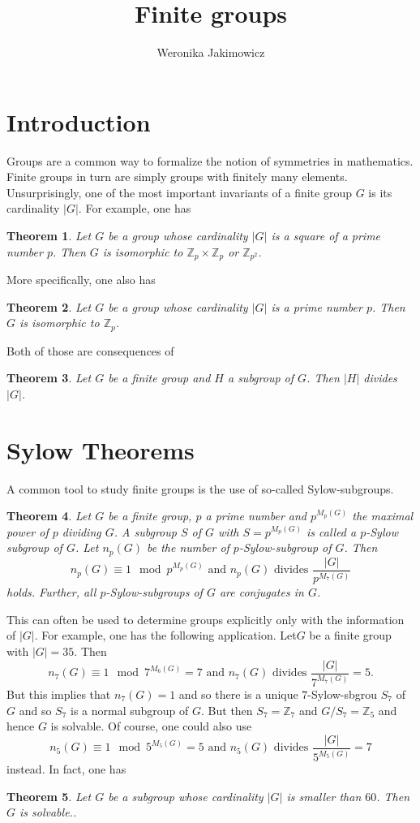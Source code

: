 \documentclass{article}
\title{Finite groups}
\author{Weronika Jakimowicz}
\newtheorem{theorem}{Theorem}[section]
\newcommand{\Z}{\mathbb{Z}}
\begin{document}
\maketitle

\section{Introduction}
Groups are a common way to formalize the notion of symmetries in mathematics. Finite groups in turn are simply groups with finitely many elements. Unsurprisingly, one of the most important invariants of a finite group $G$ is its cardinality $|G|$. For example, one has

\begin{theorem}\label{theorem:1.1}
    Let $G$ be a group whose cardinality $|G|$ is a square of a prime number $p$. Then $G$ is isomorphic to $\Z_p\times\Z_p$ or $\Z_{p^2}$.
\end{theorem}

More specifically, one also has

\begin{theorem}\label{theorem:1.2}
    Let $G$ be a group whose cardinality $|G|$ is a prime number $p$. Then $G$ is isomorphic to $\Z_p$.
\end{theorem}

Both of those are consequences of

\begin{theorem}\cite[Proposition 2.2]{Lang}
    Let $G$ be a finite group and $H$ a subgroup of $G$. Then $|H|$ divides $|G|$.
\end{theorem}

\section{Sylow Theorems}
A common tool to study finite groups is the use of so-called Sylow-subgroups.
\begin{theorem}\cite[Thereom 6.4]{Lang}
Let $G$ be a finite group, $p$ a prime number and $p^{M_p(G)}$ the maximal power of $p$ dividing $G$. A subgroup $S$ of $G$ with $S=p^{M_p(G)}$ is called a $p$-Sylow subgroup of $G$. Let $n_p(G)$ be the number of $p$-Sylow-subgroup of $G$. Then
$$n_p(G)\equiv1\mod p^{M_p(G)}\text{ and }n_p(G)\text{ divides }\frac{|G|}{p^{M_7(G)}}$$
holds. Further, all $p$-Sylow-subgroups of $G$ are conjugates in $G$.
\end{theorem}

This can often be used to determine groups explicitly only with the information of $|G|$. For example, one has the following application. Let$G$ be a finite group with $|G|=35$. Then
$$n_7(G)\equiv 1\mod7^{M_6(G)}=7\text{ and }n_7(G)\text{ divides }\frac{|G|}{7^{M_7(G)}}=5.$$
But this implies that $n_7(G)=1$ and so there is a unique $7$-Sylow-sbgrou $S_7$ of $G$ and so $S_7$ is a normal subgroup of $G$. But then $S_7=\Z_7$ and $G/S_7=\Z_5$ and hence $G$ is solvable. Of course, one could also use
$$n_5(G)\equiv 1\mod5^{M_5(G)}=5\text{ and }n_5(G)\text{ divides }\frac{|G|}{5^{M_5(G)}}=7$$
instead. In fact, one has

\begin{theorem}
Let $G$ be a subgroup whose cardinality $|G|$ is smaller than $60$. Then $G$ is solvable..
\end{theorem}




\printbibliography[title=Book on Algebra]
\end{document}
